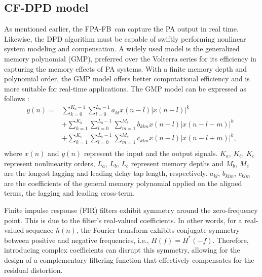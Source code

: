 \documentclass[twoside,twocolumn]{article}
\DeclareRobustCommand{\FPAFB}{FPA-FB}
\begin{document}
\subsection{CF-DPD model}
As mentioned earlier, the \FPAFB\ can capture the PA output in real time. Likewise, the DPD algorithm must be capable of swiftly performing nonlinear system modeling and compensation. A widely used model is the generalized memory polynomial (GMP), preferred over the Volterra series for its efficiency in capturing the memory effects of PA systems. With a finite memory depth and polynomial order, the GMP model offers better computational efficiency and is more suitable for real-time applications. The GMP model can be expressed as follows \citep{GMP}:
\begin{equation}
	\begin{aligned}
		y(n) = & \sum_{k=0}^{K_a-1} \sum_{l=0}^{L_a-1} a_{kl} x(n-l) \left| x(n-l) \right|^k  \\
		& + \sum_{k=1}^{K_b} \sum_{l=0}^{L_b-1} \sum_{m=1}^{M_b} b_{klm} x(n-l) \left| x(n-l-m) \right|^k  \\
		& + \sum_{k=1}^{K_c} \sum_{l=0}^{L_c-1} \sum_{m=1}^{M_c} c_{klm} x(n-l) \left| x(n-l+m) \right|^k, \\
	\end{aligned}
\end{equation}
where $x(n)$ and $y(n)$ represent the input and the output signals. $K_a$, $K_b$, $K_c$ represent nonlinearity orders, $L_a$, $L_b$, $L_c$ represent memory depths and $M_b$, $M_c$ are the longest lagging and leading delay tap length, respectively. $a_{kl}$, $b_{klm}$, $c_{klm}$ are the coefficients of the general memory
polynomial applied on the aligned terms, the lagging and leading cross-term.



Finite impulse response (FIR) filters exhibit symmetry around the zero-frequency point. This is due to the filter's real-valued coefficients. In other words, for a real-valued sequence $h(n)$, the Fourier transform exhibits conjugate symmetry between positive and negative frequencies, i.e., $ H(f)=H^*(-f) $. Therefore, introducing complex coefficients can disrupt this symmetry, allowing for the design of a complementary filtering function that effectively compensates for the residual distortion.

\end{document}
